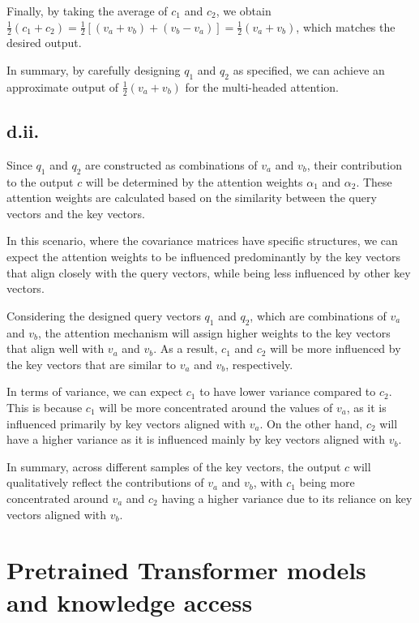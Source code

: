 \documentclass[a4paper]{article}
\begin{document}
Finally, by taking the average of $c_1$ and $c_2$, we obtain $\frac{1}{2} (c_1 + c_2) = \frac{1}{2} [(v_a + v_b) + (v_b - v_a)] = \frac{1}{2} (v_a + v_b)$, which matches the desired output.

In summary, by carefully designing $q_1$ and $q_2$ as specified, we can achieve an approximate output of $\frac{1}{2} (v_a + v_b)$ for the multi-headed attention.

\subsection*{d.ii.}

Since $q_1$ and $q_2$ are constructed as combinations of $v_a$ and $v_b$, their contribution to the output $c$ will be determined by the attention weights $\alpha_1$ and $\alpha_2$. These attention weights are calculated based on the similarity between the query vectors and the key vectors.

In this scenario, where the covariance matrices have specific structures, we can expect the attention weights to be influenced predominantly by the key vectors that align closely with the query vectors, while being less influenced by other key vectors.

Considering the designed query vectors $q_1$ and $q_2$, which are combinations of $v_a$ and $v_b$, the attention mechanism will assign higher weights to the key vectors that align well with $v_a$ and $v_b$. As a result, $c_1$ and $c_2$ will be more influenced by the key vectors that are similar to $v_a$ and $v_b$, respectively.

In terms of variance, we can expect $c_1$ to have lower variance compared to $c_2$. This is because $c_1$ will be more concentrated around the values of $v_a$, as it is influenced primarily by key vectors aligned with $v_a$. On the other hand, $c_2$ will have a higher variance as it is influenced mainly by key vectors aligned with $v_b$.

In summary, across different samples of the key vectors, the output $c$ will qualitatively reflect the contributions of $v_a$ and $v_b$, with $c_1$ being more concentrated around $v_a$ and $c_2$ having a higher variance due to its reliance on key vectors aligned with $v_b$.\\


\section{Pretrained Transformer models and knowledge access}
\end{document}
